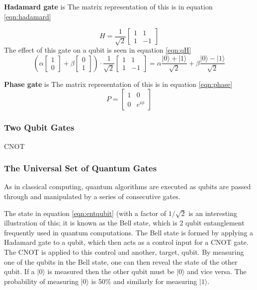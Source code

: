 {\bf Hadamard gate} is
The matrix representation of this is in equation \ref{eqn:hadamard}

\begin{equation}\label{eqn:hadamard}
    H = \frac{1}{\sqrt{2}} \begin{bmatrix}
1 & 1 \\
1 & -1 
\end{bmatrix}  
\end{equation}
The effect of this gate on a qubit is seen in equation \ref{eqn:qH}
\begin{equation}\label{eqn:qH}
    \left( \alpha \begin{bmatrix}
1 \\
0 
\end{bmatrix}  + \beta  \begin{bmatrix}
0 \\
1 
\end{bmatrix}   \right) \cdot \frac{1}{\sqrt{2}} \begin{bmatrix}
1 & 1 \\
1 & -1 
\end{bmatrix} = \alpha \frac{|0\rangle +|1\rangle}{\sqrt{2}} + \beta \frac{|0\rangle - |1\rangle}{\sqrt{2}}
\end{equation}


{\bf Phase gate} is 
The matrix representation of this is in equation \ref{eqn:phase}
\begin{equation}\label{eqn:phase}
    P =  \begin{bmatrix}
1 & 0 \\
0 & e^{i \phi}
\end{bmatrix}  
\end{equation}


\subsubsection{Two Qubit Gates}\label{sec:twoqubit}
CNOT

\subsubsection{The Universal Set of Quantum Gates}
As in classical computing, quantum algorithms are executed as qubits are passed through and manipulated by a series of consecutive gates. 

The state in equation \ref{eqn:entqubit} (with a factor of $1/\sqrt{2}$ is an interesting illustration of this; it is known as the Bell state, which is 2 qubit entanglement frequently used in quantum computations. The Bell state is formed by applying a Hadamard gate to a qubit, which then acts as a control input for a CNOT gate. The CNOT is applied to this control and another, target, qubit. \cite{mermin_quantum_2007} 
By measuring one of the qubits in the Bell state, one can then reveal the state of the other qubit. If a $|0\rangle$ is measured then the other qubit must be $|0\rangle$ and vice versa. The probability of measuring $|0\rangle$ is 50$\%$ and similarly for measuring $|1\rangle$. 

